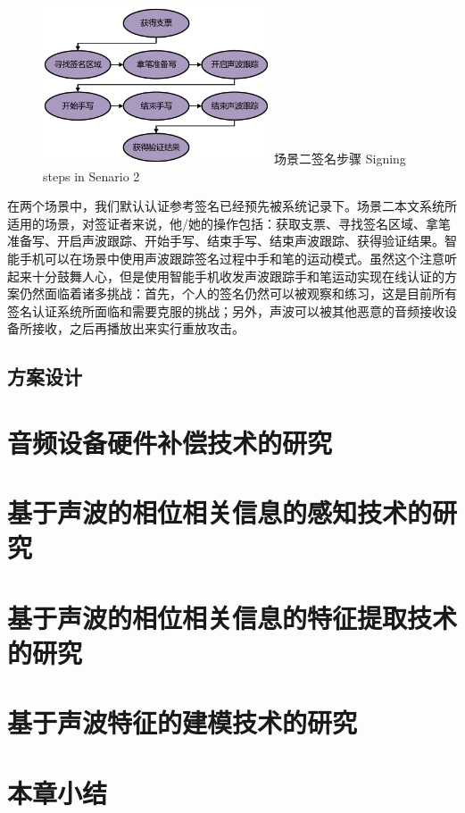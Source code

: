 \begin{figure}[!htp]
  \centering
  \includegraphics[width=0.6\textwidth]{figure/senario-actions}
  \bicaption
    {场景二签名步骤}
    {Signing steps in Senario 2}
  \label{fig:signing-steps}
\end{figure}

在两个场景中，我们默认认证参考签名已经预先被系统记录下。场景二本文系统所适用的场景，对签证者来说，他/她的操作包括：获取支票、寻找签名区域、拿笔准备写、开启声波跟踪、开始手写、结束手写、结束声波跟踪、获得验证结果。智能手机可以在场景中使用声波跟踪签名过程中手和笔的运动模式。虽然这个注意听起来十分鼓舞人心，但是使用智能手机收发声波跟踪手和笔运动实现在线认证的方案仍然面临着诸多挑战：首先，个人的签名仍然可以被观察和练习，这是目前所有签名认证系统所面临和需要克服的挑战；另外，声波可以被其他恶意的音频接收设备所接收，之后再播放出来实行重放攻击。

\subsection{方案设计}

\section{音频设备硬件补偿技术的研究}
\section{基于声波的相位相关信息的感知技术的研究}
\section{基于声波的相位相关信息的特征提取技术的研究}
\section{基于声波特征的建模技术的研究}
\section{本章小结}


